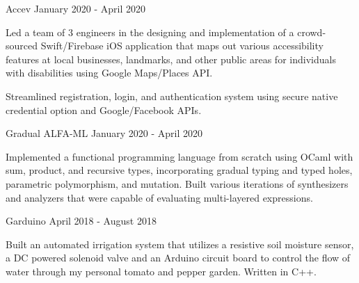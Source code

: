 \vspace{1mm}
    
    \cventry
    {} %
    {Accev} %
    {January 2020 - April 2020} %
    {} %
    {
    \vspace{-4.5mm}
      \begin{cvitems} %
        \item {Led a team of 3 engineers in the designing and implementation of a crowd-sourced Swift/Firebase iOS application that maps out various accessibility features at local businesses, landmarks, and other public areas for individuals with disabilities using Google Maps/Places API.}
        \item {Streamlined registration, login, and authentication system using secure native credential option and Google/Facebook APIs.}
      \end{cvitems}
    }
    \cventry
    {} %
    {Gradual ALFA-ML} %
    {January 2020 - April 2020} %
    {} %
    {
    \vspace{-4.5mm}
      \begin{cvitems} %
        \item {Implemented a functional programming language from scratch using OCaml with sum, product, and recursive types, incorporating gradual typing and typed holes, parametric polymorphism, and mutation. Built various iterations of synthesizers and analyzers that were capable of evaluating multi-layered expressions.}
      \end{cvitems}
    }
    \cventry
    {} %
    {Garduino} %
    {April 2018 - August 2018} %
    {} %
    {
    \vspace{-4.5mm}
      \begin{cvitems} %
        \item {Built an automated irrigation system that utilizes a resistive soil moisture sensor, a DC powered solenoid valve and an Arduino circuit board to control the flow of water through my personal tomato and pepper garden. Written in C++.}
      \end{cvitems}
    }

